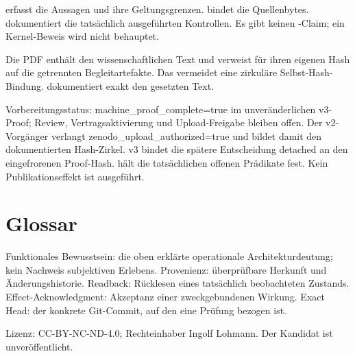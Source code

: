 \documentclass[10pt,a4paper]{article}
\begin{document}
{\footnotesize{}} erfasst die Aussagen und ihre Geltungsgrenzen. {\footnotesize{}} bindet die Quellenbytes. {\footnotesize{}} dokumentiert die tatsächlich ausgeführten Kontrollen. Es gibt keinen {\footnotesize{}}-Claim; ein Kernel-Beweis wird nicht behauptet.


Die PDF enthält den wissenschaftlichen Text und verweist für ihren eigenen Hash auf die getrennten Begleitartefakte. Das vermeidet eine zirkuläre Selbst-Hash-Bindung. {\footnotesize{}} dokumentiert exakt den gesetzten Text.


Vorbereitungsstatus: machine\_proof\_complete=true im unveränderlichen v3-Proof; Review, Vertragsaktivierung und Upload-Freigabe bleiben offen. Der v2-Vorgänger verlangt zenodo\_upload\_authorized=true und bildet damit den dokumentierten Hash-Zirkel. v3 bindet die spätere Entscheidung detached an den eingefrorenen Proof-Hash. {\footnotesize{}} hält die tatsächlichen offenen Prädikate fest. Kein Publikationseffekt ist ausgeführt.


\section*{Glossar}

Funktionales Bewusstsein: die oben erklärte operationale Architekturdeutung; kein Nachweis subjektiven Erlebens. Provenienz: überprüfbare Herkunft und Änderungshistorie. Readback: Rücklesen eines tatsächlich beobachteten Zustands. Effect-Acknowledgment: Akzeptanz einer zweckgebundenen Wirkung. Exact Head: der konkrete Git-Commit, auf den eine Prüfung bezogen ist.


Lizenz: CC-BY-NC-ND-4.0; Rechteinhaber Ingolf Lohmann. Der Kandidat ist unveröffentlicht.
\end{document}
